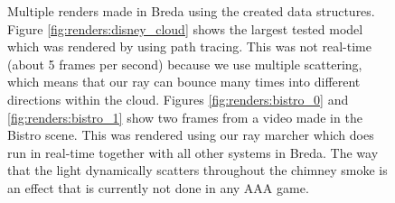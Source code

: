 \begin{figure}[H]
    \centering
    \hfill
    \hfill

    \hfill
    
    \caption{Multiple renders made in Breda using the created data structures. Figure \ref{fig:renders:disney_cloud} shows the largest tested model which was rendered by using path tracing. This was not real-time (about 5 frames per second) because we use multiple scattering, which means that our ray can bounce many times into different directions within the cloud. Figures \ref{fig:renders:bistro_0} and \ref{fig:renders:bistro_1} show two frames from a video made in the Bistro scene. This was rendered using our ray marcher which does run in real-time together with all other systems in Breda. The way that the light dynamically scatters throughout the chimney smoke is an effect that is currently not done in any AAA game.} \label{fig:renders}
\end{figure}